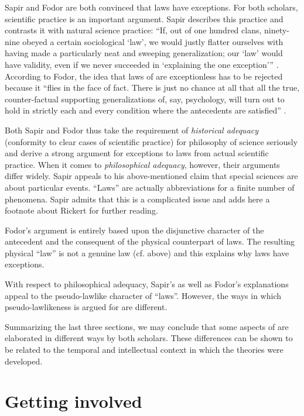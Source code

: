 \documentclass[output=paper]{langscibook}
\begin{document}
Sapir and Fodor are both convinced that  laws have exceptions. For both scholars, scientific practice is an important argument. Sapir describes this practice and contrasts it with natural science practice: ``If, out of one  hundred clans, ninety-nine obeyed a certain sociological `law', we would justly flatter ourselves with having made a particularly neat and sweeping generalization; our `law' would have validity, even if we never succeeded in `explaining the one exception''' \citep[447]{Sapir1917}. According to Fodor, the idea that laws of  are exceptionless has to be rejected because it ``flies in the face of fact. There is just no chance at all that all the true, counter-factual supporting generalizations of, say, psychology, will turn out to hold in strictly each and every condition where the antecedents are satisfied'' \citep[111]{Fodor1974}.

Both Sapir and Fodor thus take the requirement of \emph{historical adequacy} (conformity to clear cases of scientific practice) for philosophy of science seriously and derive a strong argument for exceptions to  laws from actual scientific practice. When it comes to \emph{philosophical adequacy}, however, their arguments differ widely. Sapir appeals to his above-mentioned claim that special sciences are about particular events. ``Laws'' are actually abbreviations for a finite number of phenomena. Sapir admits that this is a complicated issue and adds here a footnote about Rickert for further reading.

Fodor's argument is entirely based upon the disjunctive character of the antecedent and the consequent of the physical counterpart of  laws. The resulting physical ``law'' is not a genuine law (cf.  above) and this explains why  laws have exceptions.

With respect to philosophical adequacy, Sapir's as well as Fodor's explanations appeal to the pseudo-lawlike character of  ``laws''. However, the ways in which pseudo-lawlikeness is argued for are different.

Summarizing the last three sections, we may conclude that some aspects of  are elaborated in different ways by both scholars. These differences can be shown to be related to the temporal and intellectual context in which the theories were developed.

\section{Getting involved}
\label{sec:elffers:gettinginvolved}
\end{document}

